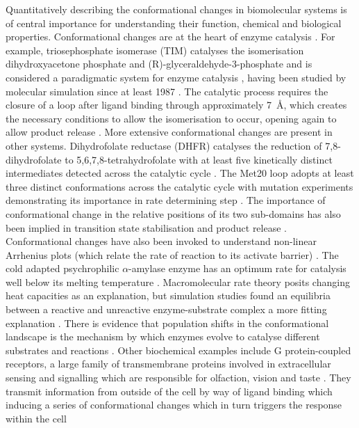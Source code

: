 Quantitatively  describing the conformational changes in biomolecular systems is of central importance for understanding their function, chemical and biological properties. Conformational changes are at the heart of enzyme catalysis \cite{hammes-schifferRelatingProteinMotion2006, karplusMolecularDynamicsProtein2005, hammesMultipleConformationalChanges2002, roca2008relationship}. For example, triosephosphate isomerase (TIM) catalyses the isomerisation dihydroxyacetone phosphate and (R)-glyceraldehyde-3-phosphate \cite{LoopMotionTriosephosphate} and is considered a paradigmatic system for enzyme catalysis \cite{richardParadigmEnzymeCatalyzedProton2012a}, having been studied by molecular simulation since at least 1987 \cite{brownMolecularDynamicsSimulations1987, josephAnatomyConformationalChange1990}.  The catalytic process requires the closure of a loop after ligand binding through approximately \SI{7}{\angstrom}, which creates the necessary conditions to allow the isomerisation to occur,  opening again to allow product release \cite{LoopMotionTriosephosphate}. More extensive conformational changes are present in other systems.  Dihydrofolate reductase (DHFR) catalyses the reduction of 7,8-dihydrofolate to 5,6,7,8-tetrahydrofolate  \cite{schnellStructureDynamicsCatalytic2004a} with at least five kinetically distinct intermediates detected across the catalytic cycle  \cite{fierkeConstructionEvaluationKinetic1987}. The Met20 loop adopts at least three distinct conformations across the catalytic cycle \cite{sawayaLoopSubdomainMovements1997} with mutation experiments demonstrating its importance in rate determining step \cite{liFunctionalRoleMobile1992}. The importance of  conformational change in the relative positions of its two sub-domains has also been implied in transition state stabilisation and product release \cite{sawayaLoopSubdomainMovements1997}. Conformational changes have also been  invoked to  understand non-linear Arrhenius plots (which relate the rate of reaction to its activate barrier)  \cite{truhlarConvexArrheniusPlots2001,danielNewUnderstandingHow2010}. The cold adapted psychrophilic $\alpha$-amylase enzyme has an optimum rate for catalysis well below its melting temperature \cite{aqvistHiddenConformationalStates2020}. Macromolecular rate theory \cite{arcusTemperatureDynamicsEnzymeCatalyzed2020} posits changing heat capacities as an explanation, but simulation studies found an equilibria between a reactive and unreactive enzyme-substrate complex a more fitting explanation \cite{aqvistHiddenConformationalStates2020}.  There is evidence that population shifts in the conformational landscape is the mechanism by which  enzymes evolve to catalyse different substrates and reactions \cite{maria-solanoRoleConformationalDynamics2018, campbellRoleProteinDynamics2016,romero-riveraRoleConformationalDynamics2017}. Other biochemical examples include G protein-coupled receptors, a large family of transmembrane proteins involved in extracellular sensing and signalling which are responsible for olfaction, vision and taste \cite{rosenbaumStructureFunctionGproteincoupled2009}.  They transmit information from outside of the cell by way of ligand binding which inducing a series of conformational changes which in turn triggers the response within the cell 